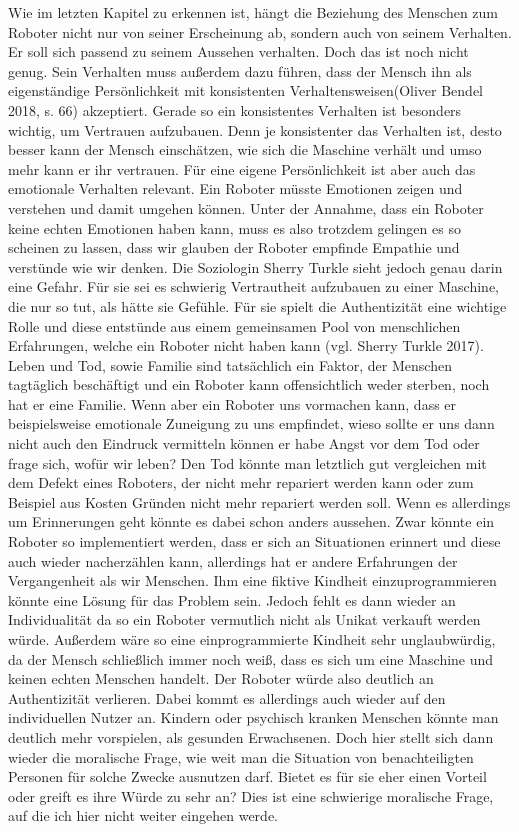 \documentclass[12pt]{article}
\begin{document}
Wie im letzten Kapitel zu erkennen ist, hängt die Beziehung des Menschen zum Roboter nicht nur von seiner Erscheinung ab, sondern auch von seinem Verhalten. Er soll sich passend zu seinem Aussehen verhalten. Doch das ist noch nicht genug. Sein Verhalten muss außerdem dazu führen, dass der Mensch ihn \glqq als eigenständige Persönlichkeit mit konsistenten Verhaltensweisen\grqq (Oliver Bendel 2018, s. 66) akzeptiert. Gerade so ein konsistentes Verhalten ist besonders wichtig, um Vertrauen aufzubauen. Denn je konsistenter das Verhalten ist, desto besser kann der Mensch einschätzen, wie sich die Maschine verhält und umso mehr kann er ihr vertrauen. Für eine eigene Persönlichkeit ist aber auch das emotionale Verhalten relevant. Ein Roboter müsste Emotionen zeigen und verstehen und damit umgehen können.\newline
Unter der Annahme, dass ein Roboter keine echten Emotionen haben kann, muss es also trotzdem gelingen es so scheinen zu lassen, dass wir glauben der Roboter empfinde Empathie und verstünde wie wir denken. Die Soziologin Sherry Turkle sieht jedoch genau darin eine Gefahr. Für sie sei es schwierig Vertrautheit aufzubauen zu einer Maschine, die nur so tut, als hätte sie Gefühle. Für sie spielt die Authentizität eine wichtige Rolle und diese entstünde aus einem gemeinsamen Pool von menschlichen Erfahrungen, welche ein Roboter nicht haben kann (vgl. Sherry Turkle 2017).\newline
Leben und Tod, sowie Familie sind tatsächlich ein Faktor, der Menschen tagtäglich beschäftigt und ein Roboter kann offensichtlich weder sterben, noch hat er eine Familie. Wenn aber ein Roboter uns vormachen kann, dass er beispielsweise emotionale Zuneigung zu uns empfindet, wieso sollte er uns dann nicht auch den Eindruck vermitteln können er habe Angst vor dem Tod oder frage sich, wofür wir leben? Den Tod könnte man letztlich gut vergleichen mit dem Defekt eines Roboters, der nicht mehr repariert werden kann oder zum Beispiel aus Kosten Gründen nicht mehr repariert werden soll. \newline
Wenn es allerdings um Erinnerungen geht könnte es dabei schon anders aussehen. Zwar könnte ein Roboter so implementiert werden, dass er sich an Situationen erinnert und diese auch wieder nacherzählen kann, allerdings hat er andere Erfahrungen der Vergangenheit als wir Menschen. Ihm eine fiktive Kindheit einzuprogrammieren könnte eine Lösung für das Problem sein. Jedoch fehlt es dann wieder an Individualität da so ein Roboter vermutlich nicht als Unikat verkauft werden würde. Außerdem wäre so eine einprogrammierte Kindheit sehr unglaubwürdig, da der Mensch schließlich immer noch weiß, dass es sich um eine Maschine und keinen echten Menschen handelt. Der Roboter würde also deutlich an Authentizität verlieren. Dabei kommt es allerdings auch wieder auf den individuellen Nutzer an. Kindern oder psychisch kranken Menschen könnte man deutlich mehr vorspielen, als gesunden Erwachsenen. Doch hier stellt sich dann wieder die moralische Frage, wie weit man die Situation von benachteiligten Personen für solche Zwecke ausnutzen darf. Bietet es für sie eher einen Vorteil oder greift es ihre Würde zu sehr an? Dies ist eine schwierige moralische Frage, auf die ich hier nicht weiter eingehen werde.\newline
\end{document}
